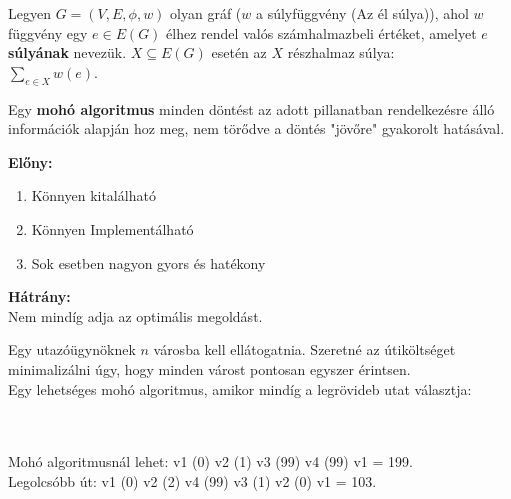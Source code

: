 \documentclass{beamer}
\newcommand{\mmedskip}{\vspace{0.5em}}
\begin{document}
\begin{frame}
\begin{tcolorbox}[title={Gráf súlya}]
Legyen $G = (V, E, {\phi}, w)$ olyan gráf ($w$ a súlyfüggvény (Az él súlya)), ahol $w$ függvény egy $e \in E(G)$ élhez rendel valós számhalmazbeli értéket, amelyet $e$ \textbf{súlyának} nevezük. $X \subseteq E(G)$ esetén az $X$ részhalmaz súlya:\\
\mmedskip
$\sum_{e \in X} w(e)$.
\end{tcolorbox}

\begin{tcolorbox}[title={Def.: Mohó algoritmus}]
Egy \textbf{mohó algoritmus} minden döntést az adott pillanatban rendelkezésre álló információk alapján hoz meg, nem törődve a döntés "jövőre" gyakorolt hatásával.
\end{tcolorbox}

\begin{tcolorbox}[title={Ész}]
\textbf{Előny:}\\
\mmedskip
\begin{enumerate}
\item Könnyen kitalálható
\item Könnyen Implementálható
\item Sok esetben nagyon gyors és hatékony
\end{enumerate}
\textbf{Hátrány:}\\
Nem mindíg adja az optimális megoldást.
\end{tcolorbox}
\end{frame}


\begin{frame}
\begin{tcolorbox}[title={Ellenpélda: TSP / Travelling Salesman Problem}]
Egy utazóügynöknek $n$ városba kell ellátogatnia. Szeretné az útiköltséget minimalizálni úgy, hogy minden várost pontosan egyszer érintsen.\\
\tcblower
Egy lehetséges mohó algoritmus, amikor mindíg a legrövideb utat választja:\\
\\
\mmedskip
{}
\GraphInit[vstyle=Normal]
\SetVertexSimple[MinSize    = 16pt, LineColor = black, FillColor = mygreen]
\\
\mmedskip
Mohó algoritmusnál lehet: v1 (0) v2 (1) v3 (99) v4 (99) v1 = 199.\\
Legolcsóbb út: v1 (0) v2 (2) v4 (99) v3 (1) v2 (0) v1 = 103.
\end{tcolorbox}
\end{frame}
\end{document}
